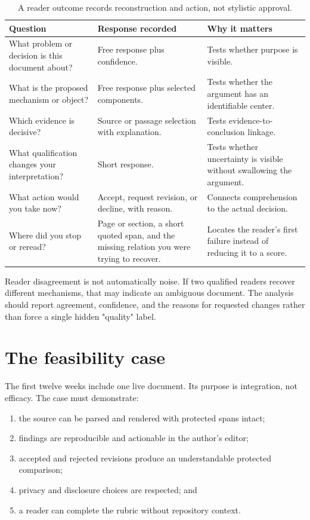 \begin{table}[H]
\centering
\small
\begin{tabularx}{\textwidth}{@{}p{}L p{0.25\textwidth}@{}}
\toprule
Question & Response recorded & Why it matters \\
\midrule
What problem or decision is this document about? & Free response plus
confidence. & Tests whether purpose is visible. \\
What is the proposed mechanism or object? & Free response plus selected
components. & Tests whether the argument has an identifiable center. \\
Which evidence is decisive? & Source or passage selection with explanation. &
Tests evidence-to-conclusion linkage. \\
What qualification changes your interpretation? & Short response. & Tests
whether uncertainty is visible without swallowing the argument. \\
What action would you take now? & Accept, request revision, or decline, with
reason. & Connects comprehension to the actual decision. \\
Where did you stop or reread? & Page or section, a short quoted span, and the
missing relation you were trying to recover. & Locates the reader's first
failure instead of reducing it to a score. \\
\bottomrule
\end{tabularx}
\caption{A reader outcome records reconstruction and action, not stylistic
approval.}
\label{tab:reader-rubric}
\end{table}

Reader disagreement is not automatically noise. If two qualified readers
recover different mechanisms, that may indicate an ambiguous document. The
analysis should report agreement, confidence, and the reasons for requested
changes rather than force a single hidden "quality" label.

\section{The feasibility case}

The first twelve weeks include one live document. Its purpose is integration,
not efficacy. The case must demonstrate:

\begin{enumerate}
\item the source can be parsed and rendered with protected spans intact;
\item findings are reproducible and actionable in the author's editor;
\item accepted and rejected revisions produce an understandable protected
      comparison;
\item privacy and disclosure choices are respected; and
\item a reader can complete the rubric without repository context.
\end{enumerate}


